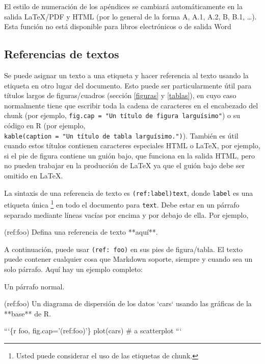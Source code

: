 \documentclass[12pt,]{krantz}
\makeatletter
\newenvironment{Shaded}{\begin{snugshade}}{\end{snugshade}}
\newcommand{\BaseNTok}[1]{\textcolor[rgb]{0.00,0.00,0.81}{#1}}
\newcommand{\NormalTok}[1]{#1}
\newenvironment{kframe}{%
\medskip{}
\setlength{\fboxsep}{.8em}
 \def\at@end@of@kframe{}%
 \ifinner\ifhmode%
  \def\at@end@of@kframe{\end{minipage}}%
  \begin{minipage}{\columnwidth}%
 \fi\fi%
 \def\FrameCommand##1{\hskip\@totalleftmargin \hskip-\fboxsep
 \colorbox{shadecolor}{##1}\hskip-\fboxsep
     \hskip-\linewidth \hskip-\@totalleftmargin \hskip\columnwidth}%
 \MakeFramed {\advance\hsize-\width
   \@totalleftmargin\z@ \linewidth\hsize
   \@setminipage}}%
 {\par\unskip\endMakeFramed%
 \at@end@of@kframe}
\renewenvironment{Shaded}{\begin{kframe}}{\end{kframe}}
\theoremstyle{definition}
\theoremstyle{definition}
\theoremstyle{definition}
\theoremstyle{remark}
\makeatother
\begin{document}
El estilo de numeración de los apéndices se cambiará automáticamente en
la salida LaTeX/PDF y HTML (por lo general de la forma A, A.1, A.2, B,
B.1, \ldots{}). Esta función no está disponible para libros electrónicos
o de salida Word

\subsection{Referencias de textos}\label{referencias-de-textos}

Se puede asignar un texto a una etiqueta y hacer referencia al texto
usando la etiqueta en otro lugar del documento. Esto puede ser
particularmente útil para títulos largos de figuras/cuadros (sección
\ref{figuras} y \ref{tablas}), en cuyo caso normalmente tiene que
escribir toda la cadena de caracteres en el encabezado del chunk (por
ejemplo, \texttt{fig.cap\ =\ "Un\ título\ de\ figura\ larguísimo"}) o su
código en R (por ejemplo,
\texttt{kable(caption\ =\ "Un\ título\ de\ tabla\ larguísimo.")}).
También es útil cuando estos títulos contienen caracteres especiales
HTML o LaTeX, por ejemplo, si el pie de figura contiene un guión bajo,
que funciona en la salida HTML, pero no pueden trabajar en la producción
de LaTeX ya que el guión bajo debe ser omitido en LaTeX.

La sintaxis de una referencia de texto es \texttt{(ref:label)text},
donde \texttt{label} es una etiqueta única \footnote{Usted puede
  considerar el uso de las etiquetas de chunk.} en todo el documento
para \texttt{text}. Debe estar en un párrafo separado mediante líneas
vacías por encima y por debajo de ella. Por ejemplo,

\begin{Shaded}
\begin{Highlighting}[]
\NormalTok{(ref:foo) Defina una referencia de texto **aquí**. }
\end{Highlighting}
\end{Shaded}

A continuación, puede usar \texttt{(ref:\ foo)} en sus pies de
figura/tabla. El texto puede contener cualquier cosa que Markdown
soporte, siempre y cuando sea un solo párrafo. Aquí hay un ejemplo
completo:

\begin{Shaded}
\begin{Highlighting}[]
\NormalTok{Un párrafo normal.}

\NormalTok{(ref:foo) Un diagrama de dispersión de los datos }\BaseNTok{`cars`}\NormalTok{ usando las gráficas de la **base** de R. }

\NormalTok{```\{r foo, fig.cap='(ref:foo)'\}}
\NormalTok{plot(cars)  # a scatterplot}
\NormalTok{```}
\end{Highlighting}
\end{Shaded}
\end{document}

